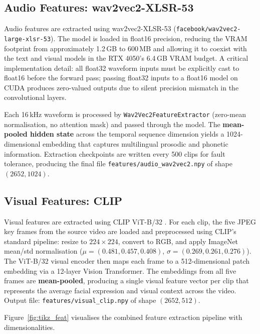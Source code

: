 \subsection{Audio Features: wav2vec2-XLSR-53}

Audio features are extracted using wav2vec2-XLSR-53 \cite{conneau2021xlsr} (\texttt{facebook/wav2vec2-large-xlsr-53}). The model is loaded in float16 precision, reducing the VRAM footprint from approximately 1.2\,GB to 600\,MB and allowing it to coexist with the text and visual models in the RTX 4050's 6.4\,GB VRAM budget. A critical implementation detail: all float32 waveform inputs must be explicitly cast to float16 before the forward pass; passing float32 inputs to a float16 model on CUDA produces zero-valued outputs due to silent precision mismatch in the convolutional layers.

Each 16\,kHz waveform is processed by \texttt{Wav2Vec2FeatureExtractor} (zero-mean normalisation, no attention mask) and passed through the model. The \textbf{mean-pooled hidden state} across the temporal sequence dimension yields a 1024-dimensional embedding that captures multilingual prosodic and phonetic information. Extraction checkpoints are written every 500 clips for fault tolerance, producing the final file \texttt{features/audio\_wav2vec2.npy} of shape $(2652, 1024)$.

\subsection{Visual Features: CLIP}

Visual features are extracted using CLIP ViT-B/32 \cite{radford2021clip}. For each clip, the five JPEG key frames from the source video are loaded and preprocessed using CLIP's standard pipeline: resize to $224\times224$, convert to RGB, and apply ImageNet mean/std normalisation ($\mu = (0.481, 0.457, 0.408)$, $\sigma = (0.269, 0.261, 0.276)$). The ViT-B/32 visual encoder then maps each frame to a 512-dimensional patch embedding via a 12-layer Vision Transformer. The embeddings from all five frames are \textbf{mean-pooled}, producing a single visual feature vector per clip that represents the average facial expression and visual context across the video. Output file: \texttt{features/visual\_clip.npy} of shape $(2652, 512)$.

Figure~\ref{fig:tikz_feat} visualises the combined feature extraction pipeline with dimensionalities.

